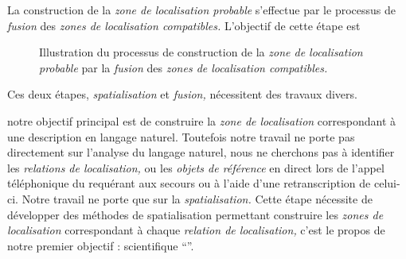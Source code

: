 La construction de la \emph{zone de localisation probable} s'effectue
par le processus de \emph{fusion} des \emph{zones de localisation
  compatibles.} L'objectif de cette étape est 


\begin{figure}
  \centering
  
  \caption{Illustration du processus de construction de la \emph{zone
      de localisation probable} par la \emph{fusion} des \emph{zones
      de localisation compatibles.}}
  \label{fig:obj_fus}
\end{figure}

Ces deux étapes, \emph{spatialisation} et \emph{fusion,} nécessitent
des travaux divers.

notre objectif principal est de construire la
\emph{zone de localisation} correspondant à une description en langage
naturel. Toutefois notre travail ne porte pas directement sur
l'analyse du langage naturel, nous ne cherchons pas à identifier les
\emph{relations de localisation,} ou les \emph{objets de référence} en
direct lors de l'appel téléphonique du requérant aux secours ou à
l'aide d'une retranscription de celui-ci. Notre travail ne porte que
sur la \emph{spatialisation.} Cette étape nécessite de développer des
méthodes de spatialisation permettant construire les \emph{zones de
  localisation} correspondant à chaque \emph{relation de
  localisation,} c'est le propos de notre premier objectif :
scientifique \enquote{}.





